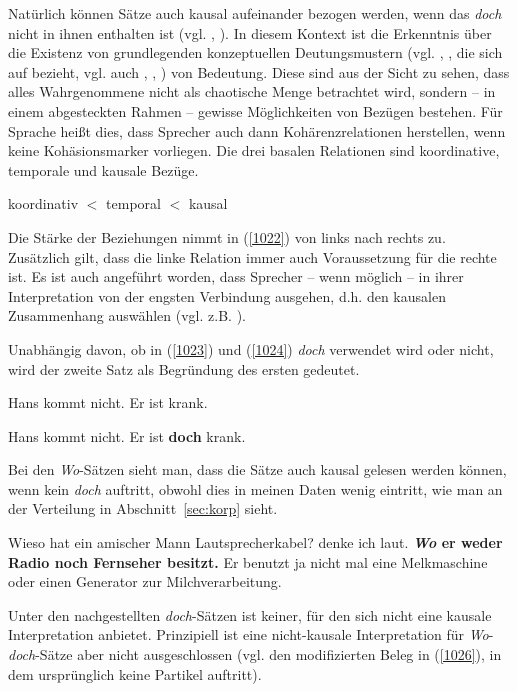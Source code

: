 {Natürlich können Sätze auch kausal aufeinander bezogen werden, wenn das \textit{doch} nicht in ihnen enthalten ist (vgl. \citealt[168]{Oennerfors1997}, \citealt[171]{Pittner2011}). In diesem Kontext ist die Erkenntnis über die Existenz von  grundlegenden konzeptu\-ellen Deutungsmustern (vgl. \citealt[228-229]{Linke2001}, \citealt[26-28]{Averintseva-Klisch2013}, die sich auf \citet{Hume1955[1748]} bezieht, vgl. auch \citealt[6]{Sanders1992}, \citealt[339-340]{Fabricius-Hansen2000}, \citealt{Kehler2002, Kehler2004}) von Bedeutung. Diese sind aus der Sicht zu sehen, dass alles Wahrgenommene nicht als chaotische Menge betrachtet wird, sondern – in einem abgesteckten Rahmen – gewisse Möglichkeiten von Bezügen bestehen. Für Sprache heißt dies, dass Sprecher auch dann Kohärenzrelationen  herstellen, wenn keine Kohäsionsmarker  vorliegen. Die drei basalen Relationen sind koordinative, temporale und kausale Bezüge.

\begin{exe}
	\ex\label{1022} 
	koordinativ $<$ temporal $<$ kausal
\end{exe}
Die Stärke der Beziehungen nimmt in (\ref{1022}) von links nach rechts zu. Zusätz\-lich gilt, dass die linke Relation immer auch Voraussetzung für die rechte ist. Es ist auch angeführt worden, dass Sprecher – wenn möglich – in ihrer Interpretation von der engsten Verbindung ausgehen, d.h. den kausalen Zusammenhang auswählen (vgl. z.B. \citealt[58, Fn 6, 61-62]{Breindl2006}).

Unabhängig davon, ob in (\ref{1023}) und (\ref{1024}) \textit{doch} verwendet wird oder nicht, wird der zweite Satz als Begründung des ersten gedeutet.

\begin{exe}
	\ex\label{1023} 
	Hans kommt nicht. Er ist krank.
\end{exe}
\vspace{-0.65cm}
\begin{exe}
	\ex\label{1024} 
	Hans kommt nicht. Er ist \textbf{doch} krank.
	\hfill\hbox {\citet[168]{Oennerfors1997}}
\end{exe}
Bei den \textit{Wo}-Sätzen sieht man, dass die Sätze auch kausal gelesen werden können, wenn kein \textit{doch} auftritt, obwohl dies in meinen Daten wenig eintritt, wie man an der Verteilung in Abschnitt~\ref{sec:korp} sieht.

\begin{exe}
	\ex\label{1025}
	 \scriptsize 
	\glqq Wieso hat ein amischer Mann Lautsprecherkabel?\grqq{} denke ich laut. \glqq \textbf{\textit{Wo} er weder Radio noch Fernseher besitzt.} Er benutzt ja 			nicht mal eine Melkmaschine oder einen Generator zur Milchverarbeitung.\grqq{} 
	\newline
	\hbox{}\hfill\hbox {\citet[53]{Castillo2011}}
\end{exe}
Unter den nachgestellten \textit{doch}-Sätzen ist keiner, für den sich nicht eine kausale Interpretation anbietet. Prinzipiell ist eine nicht-kausale Interpretation für \textit{Wo}-\textit{doch}-Sätze aber nicht ausgeschlossen (vgl. den modifizierten Beleg in (\ref{1026}), in dem ursprünglich keine Partikel auftritt).
	
}
